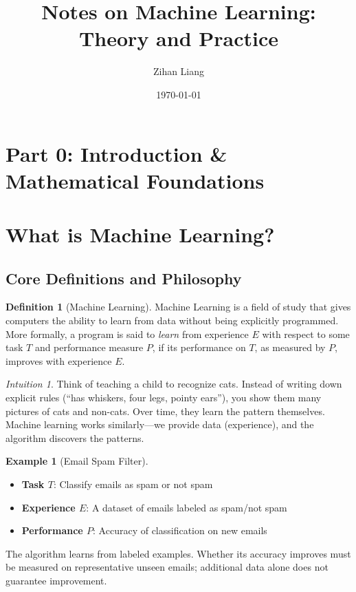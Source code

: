 \documentclass[11pt,twoside]{article}
\title{Notes on Machine Learning: Theory and Practice}
\author{Zihan Liang}
\date{\mydate\today}
\numberwithin{equation}{section}
\theoremstyle{plain}
\theoremstyle{definition}
\newtheorem{definition}[theorem]{Definition}
\newtheorem{example}[theorem]{Example}
\theoremstyle{remark}
\newtheorem{intuition}[theorem]{Intuition}
\begin{document}
\maketitle

\tableofcontents
\newpage

\section*{Part 0: Introduction \& Mathematical Foundations}

\section{What is Machine Learning?}
\label{sec:what-is-ml}

\subsection{Core Definitions and Philosophy}

\begin{definition}[Machine Learning]
Machine Learning is a field of study that gives computers the ability to learn from data without being explicitly programmed. More formally, a program is said to \emph{learn} from experience $E$ with respect to some task $T$ and performance measure $P$, if its performance on $T$, as measured by $P$, improves with experience $E$.
\end{definition}

\begin{intuition}
Think of teaching a child to recognize cats. Instead of writing down explicit rules (``has whiskers, four legs, pointy ears''), you show them many pictures of cats and non-cats. Over time, they learn the pattern themselves. Machine learning works similarly---we provide data (experience), and the algorithm discovers the patterns.
\end{intuition}

\begin{example}[Email Spam Filter]
\begin{itemize}
\item \textbf{Task $T$}: Classify emails as spam or not spam
\item \textbf{Experience $E$}: A dataset of emails labeled as spam/not spam
\item \textbf{Performance $P$}: Accuracy of classification on new emails
\end{itemize}
The algorithm learns from labeled examples. Whether its accuracy improves must be measured on representative unseen emails; additional data alone does not guarantee improvement.
\end{example}
\end{document}
